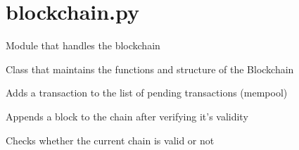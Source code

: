 \documentclass[letterpaper,10pt,english]{sphinxmanual}
\begin{document}
\label{\detokenize{index:module-blockchain}}

\section{blockchain.py}
\label{\detokenize{index:blockchain-py}}
Module that handles the blockchain

\begin{fulllineitems}
\label{\detokenize{index:blockchain.Blockchain}}
Class that maintains the functions and structure of the Blockchain

\begin{fulllineitems}
\label{\detokenize{index:blockchain.Blockchain.add_transaction}}
Adds a transaction to the list of pending transactions (mempool)

\end{fulllineitems}


\begin{fulllineitems}
\label{\detokenize{index:blockchain.Blockchain.append_block}}
Appends a block to the chain after verifying it’s validity

\end{fulllineitems}


\begin{fulllineitems}
\label{\detokenize{index:blockchain.Blockchain.check_validity}}
Checks whether the current chain is valid or not


\end{fulllineitems}
\end{fulllineitems}
\end{document}
